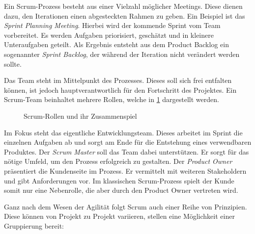 Ein Scrum-Prozess besteht aus einer Vielzahl möglicher Meetings. Diese dienen dazu, den Iterationen einen abgesteckten Rahmen zu geben. Ein Beispiel ist das \textit{Sprint Planning Meeting}. Hierbei wird der kommende Sprint vom Team vorbereitet. Es werden Aufgaben priorisiert, geschätzt und in kleinere Unteraufgaben geteilt. Als Ergebnis entsteht aus dem Product Backlog ein sogenannter \textit{Sprint Backlog}, der während der Iteration nicht verändert werden sollte. \cite[S. 29]{wirdemann_scrum_2017}

Das Team steht im Mittelpunkt des Prozesses. Dieses soll sich frei entfalten können, ist jedoch hauptverantwortlich für den Fortschritt des Projektes. Ein Scrum-Team beinhaltet mehrere Rollen, welche in \ref{fig:scrumrollen} dargestellt werden. 

\begin{figure}[H]
	\centering
	\caption[Scrum-Rollen und ihr Zusammenspiel]{Scrum-Rollen und ihr Zusammenspiel \protect \cite[S. 36]{wirdemann_scrum_2017}}
	\label{fig:scrumrollen}
\end{figure}

Im Fokus steht das eigentliche Entwicklungsteam. Dieses arbeitet im Sprint die einzelnen Aufgaben ab und sorgt am Ende für die Entstehung eines verwendbaren Produktes. Der \textit{Scrum Master} soll das Team dabei unterstützen. Er sorgt für das nötige Umfeld, um den Prozess erfolgreich zu gestalten. Der \textit{Product Owner} präsentiert die Kundenseite im Prozess. Er vermittelt mit weiteren Stakeholdern und gibt Anforderungen vor. Im klassischen Scrum-Prozess spielt der Kunde somit nur eine Nebenrolle, die aber durch den Product Owner vertreten wird. 

Ganz nach dem Wesen der Agilität folgt Scrum auch einer  Reihe von Prinzipien. Diese können von Projekt zu Projekt variieren,  stellen eine Möglichkeit einer Gruppierung bereit:


